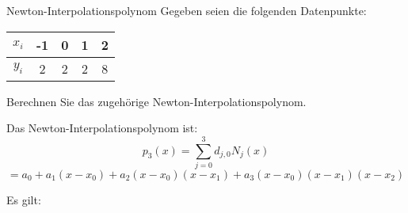 \begin{example}{Newton-Interpolationspolynom}
    Gegeben seien die folgenden Datenpunkte: 
    
    \begin{center}
        \begin{tabular}{|c||c|c|c|c|}
            \hline
            $x_i$ & -1 & 0 & 1 & 2 \\ 
            \hline
            $y_i$ & 2  & 2 & 2 & 8 \\
            \hline
        \end{tabular}
    \end{center}
    
    Berechnen Sie das zugehörige Newton-Interpolationspolynom.
    
    \exampleseparator
    
    Das Newton-Interpolationspolynom ist:
    \[ 
        p_3(x) = \sum_{j=0}^{3} d_{j,0} N_j(x) 
    \]
    \[ 
        = a_0 + a_1 (x - x_0) + a_2 (x - x_0) (x - x_1) + a_3 (x - x_0) (x - x_1) (x - x_2) 
    \]
    
    Es gilt:
    

\end{example}
